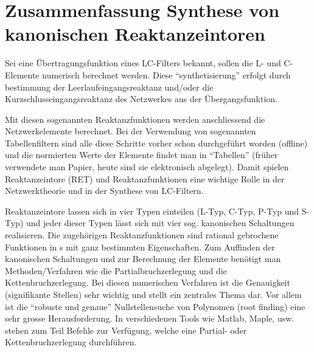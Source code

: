 \documentclass[notitlepage]{fhnwreport/fhnwreport}
\begin{document}
\section*{Zusammenfassung Synthese von kanonischen Reaktanzeintoren}

Sei eine  \"Ubertragungsfunktion  eines  LC-Filters bekannt, sollen die L- und
C-Elemente numerisch berechnet werden. Diese ``synthetisierung'' erfolgt durch
bestimmung        der       Leerlaufeingangsreaktanz       und/oder        die
Kurzschlusseingangsreaktanz  des  Netzwerkes  aus   der   \"Ubergangsfunktion.

Mit   diesen   sogenannten   Reaktanzfunktionen   werden   anschliessend   die
Netzwerkelemente berechnet. Bei der Verwendung von sogenannten Tabellenfiltern
sind alle diese Schritte vorher schon durchgef\"uhrt worden  (offline) und die
normierten Werte der Elemente findet  man in ``Tabellen'' (fr\"uher verwendete
man   Papier,   heute   sind   sie   elektronisch  abgelegt).  Damit   spielen
Reaktanzeintore  (RET)  und  Reaktanzfunktionen  eine  wichtige  Rolle  in der
Netzwerktheorie und in der Synthese von LC-Filtern.

Reaktanzeintore lassen sich in  vier  Typen einteilen (L-Typ, C-Typ, P-Typ und
S-Typ)  und  jeder  dieser  Typen  l\"asst  sich  mit  vier  sog.  kanonischen
Schaltungen  realisieren.  Die  zugeh\"origen Reaktanzfunktionen sind rational
gebrochene  Funktionen  in  s mit ganz bestimmten Eigenschaften. Zum Auffinden
der kanonischen Schaltungen und  zur  Berechnung  der  Elemente ben\"otigt man
Methoden/Verfahren wie die Partialbruchzerlegung und die Kettenbruchzerlegung.
Bei diesen  numerischen  Verfahren  ist die Genauigkeit (signifikante Stellen)
sehr  wichtig und stellt ein zentrales Thema dar. Vor allem ist die  ``robuste
und genaue'' Nullstellensuche von Polynomen (root  finding)  eine  sehr grosse
Herausforderung. In  verschiedenen  Tools  wie  Matlab, Maple, usw. stehen zum
Teil Befehle zur  Verf\"ugung,  welche eine Partial- oder Kettenbruchzerlegung
durchf\"uhren.
\end{document}
